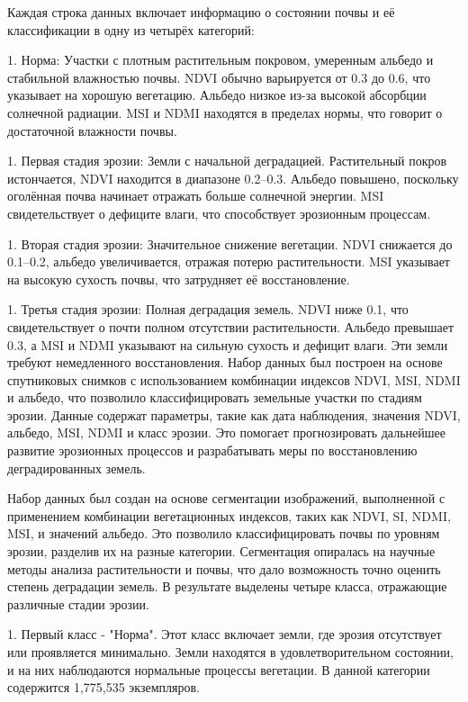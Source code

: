 \begin{multicols}{2}
Каждая строка данных включает информацию о состоянии почвы и её
классификации в одну из четырёх категорий:

1. Норма: Участки с плотным растительным покровом, умеренным
альбедо и стабильной влажностью почвы. NDVI обычно варьируется от 0.3
до 0.6, что указывает на хорошую вегетацию. Альбедо низкое из-за
высокой абсорбции солнечной радиации. MSI и NDMI находятся в пределах
нормы, что говорит о достаточной влажности почвы.

1. Первая стадия эрозии: Земли с начальной деградацией.
Растительный покров истончается, NDVI находится в диапазоне 0.2--0.3.
Альбедо повышено, поскольку оголённая почва начинает отражать больше
солнечной энергии. MSI свидетельствует о дефиците влаги, что
способствует эрозионным процессам.

1. Вторая стадия эрозии: Значительное снижение вегетации. NDVI
снижается до 0.1--0.2, альбедо увеличивается, отражая потерю
растительности. MSI указывает на высокую сухость почвы, что затрудняет
её восстановление.

1. Третья стадия эрозии: Полная деградация земель. NDVI ниже
0.1, что свидетельствует о почти полном отсутствии растительности.
Альбедо превышает 0.3, а MSI и NDMI указывают на сильную сухость и
дефицит влаги. Эти земли требуют немедленного восстановления.
Набор данных был построен на основе спутниковых снимков с использованием
комбинации индексов NDVI, MSI, NDMI и альбедо, что позволило
классифицировать земельные участки по стадиям эрозии. Данные содержат
параметры, такие как дата наблюдения, значения NDVI, альбедо, MSI, NDMI
и класс эрозии. Это помогает прогнозировать дальнейшее развитие
эрозионных процессов и разрабатывать меры по восстановлению
деградированных земель.

Набор данных был создан на основе сегментации изображений, выполненной с
применением комбинации вегетационных индексов, таких как NDVI, SI, NDMI,
MSI, и значений альбедо. Это позволило классифицировать почвы по уровням
эрозии, разделив их на разные категории. Сегментация опиралась на
научные методы анализа растительности и почвы, что дало возможность
точно оценить степень деградации земель. В результате выделены четыре
класса, отражающие различные стадии эрозии.


1. Первый класс - "Норма". Этот класс включает земли, где эрозия
отсутствует или проявляется минимально. Земли находятся в
удовлетворительном состоянии, и на них наблюдаются нормальные процессы
вегетации. В данной категории содержится 1,775,535 экземпляров.


\end{multicols}
